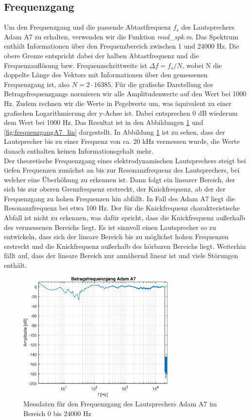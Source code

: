 \subsection{Frequenzgang}
\label{subsec:b}
Um den Frequenzgang und die passende Abtastfrequenz $f_s$ des Lautsprechers Adam A7 zu erhalten, verwenden wir die Funktion \textit{read\_spk.m}.
Das Spektrum enthält Informationen über den Frequenzbereich zwischen 1 und 24000 Hz.
Die obere Grenze entspricht dabei der halben Abtastfrequenz und die Frequenzauflösung bzw. Frequenzschrittweite ist $\Delta f = f_s / N$, wobei N die doppelte Länge des Vektors mit Informationen über den gemessenen Frequenzgang ist, also $N = 2 \cdot 16385$.
Für die grafische Darstellung des Betragsfrequenzgangs normieren wir alle Amplitudenwerte auf den Wert bei 1000 Hz.
Zudem rechnen wir die Werte in Pegelwerte um, was äquivalent zu einer grafischen Logarithmierung der y-Achse ist.
Dabei entsprechen 0 dB wiederum dem Wert bei 1000 Hz.
Das Resultat ist in den Abbildungen \ref{fig:frequenzgangA7} und \ref{fig:frequenzgangA7_lin} dargestellt. 
In Abbildung \ref{fig:frequenzgangA7} ist zu sehen, dass der Lautsprecher bis zu einer Frequenz von ca. 20 kHz vermessen wurde, die Werte danach enthalten keinen Informationsgehalt mehr.\\
Der theoretische Frequenzgang eines elektrodynamischen Lautsprechers steigt bei tiefen Frequenzen zunächst an bis zur Resonanzfrequenz des Lautsprechers, bei welcher eine Überhöhung zu erkennen ist.
Dann folgt ein linearer Bereich, der sich bis zur oberen Grenzfrequenz erstreckt, der Knickfrequenz, ab der der Frequenzgang zu hohen Frequenzen hin abfällt. 
In Fall des Adam A7 liegt die Resonanzfrequenz bei etwa 100 Hz.
Der für die Knickfrequenz charakteristische Abfall ist nicht zu erkennen, was dafür spricht, dass die Knickfrequenz außerhalb des vermessenen Bereichs liegt.
Es ist sinnvoll einen Lautsprecher so zu entwickeln, dass sich der lineare Bereich bis zu möglichst hohen Frequenzen erstreckt und die Knickfrequenz außerhalb des hörbaren Bereichs liegt.
Weiterhin fällt auf, dass der lineare Bereich nur annähernd linear ist und viele Störungen enthält.\\

\begin{figure}[H]
        \centering
        \includegraphics[width=0.7\textwidth]{Figures/frequenzgangA7.eps}
        \caption{Messdaten für den Frequenzgang des Lautsprechers Adam A7 im Bereich 0 bis 24000 Hz}
        \label{fig:frequenzgangA7}
\end{figure}

